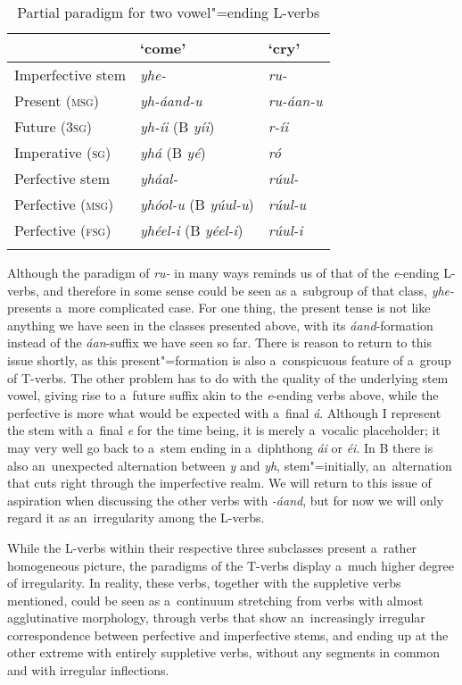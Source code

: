 \begin{table}
\caption{Partial paradigm for two vowel"=ending L-verbs}
\begin{tabularx}{\textwidth}{ Q Q Q }
\lsptoprule
&
`come' &
`cry'\\\midrule
Imperfective stem &
\textit{yhe-} &
\textit{ru-} \\
Present (\textsc{msg}) &
\textit{yh-áand-u} &
\textit{ru-áan-u} \\
Future (\textsc{3sg}) &
\textit{yh-íi} (B \textit{yíi}) &
\textit{r-íi} \\
Imperative (\textsc{sg}) &
\textit{yhá} (B \textit{yé}) &
\textit{ró} \\
Perfective stem &
\textit{yháal-} &
\textit{rúul-} \\
Perfective (\textsc{msg}) &
\textit{yhóol-u} (B \textit{yúul-u}) &
\textit{rúul-u} \\
Perfective (\textsc{fsg}) &
\textit{yhéel-i} (B \textit{yéel-i}) &
\textit{rúul-i} \\\lspbottomrule
\end{tabularx}
\label{tab:8-7}
\end{table}


Although the paradigm of \textit{ru-} in many ways reminds us of that of the \textit{e}-ending L-verbs, and therefore in some sense could be seen as a~subgroup of that class, \textit{yhe-} presents a~more complicated case. For one thing, the present tense is not like anything we have seen in the classes presented above, with its \textit{áand}-formation instead of the \textit{áan}-suffix we have seen so far. There is reason to return to this issue shortly, as this present"=formation is also a~conspicuous feature of a~group of T-verbs. The other problem has to do with the quality of the underlying stem vowel, giving rise to a~future suffix akin to the \textit{e}-ending verbs above, while the perfective is more what would be expected with a~final \textit{á}. Although I represent the stem with a~final \textit{e} for the time being, it is merely a~vocalic placeholder; it may very well go back to a~stem ending in a~diphthong \textit{ái} or \textit{éi}. In B there is also an~unexpected alternation between \textit{y} and \textit{yh}, stem"=initially, an~alternation that cuts right through the imperfective realm. We will return to this issue of aspiration when discussing the other verbs with \textit{-áand}, but for now we will only regard it as an~irregularity among the L-verbs.


While the L-verbs within their respective three subclasses present a~rather homogeneous picture, the paradigms of the T-verbs display a~much higher degree of irregularity. In reality, these verbs, together with the suppletive verbs mentioned, could be seen as a~continuum stretching from verbs with almost agglutinative morphology, through verbs that show an~increasingly irregular correspondence between perfective and imperfective stems, and ending up at the other extreme with entirely suppletive verbs, without any segments in common and with irregular inflections. 


